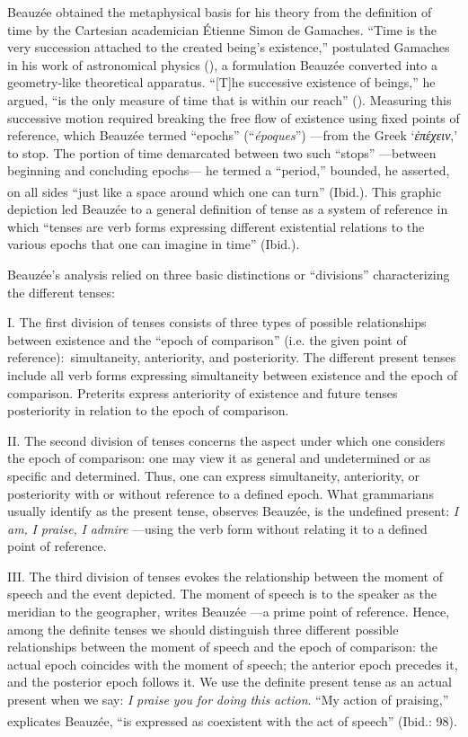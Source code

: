 \documentclass[output=paper]{langsci/langscibook}
\begin{document}
 Beauzée obtained the metaphysical basis for his theory from the definition of time by the Cartesian academician Étienne Simon de Gamaches. “Time is the very succession attached to the created being’s existence,” postulated Gamaches in his work of astronomical physics (\citeyear[28]{gamaches_astronomie_1740}), a formulation Beauzée converted into a geometry\nobreakdash-like theoretical apparatus. “[T]he successive existence of beings,” he argued, “is the only measure of time that is within our reach” (\citealt[96]{beauzee_tems_1765}). Measuring this successive motion required breaking the free flow of existence using fixed points of reference, which Beauzée termed “epochs” (“\textit{époques}”) —from the Greek ‘\textit{ἐπέχειν},’ to stop. The portion of time demarcated between two such “stops” —between beginning and concluding epochs— he termed a “period,” bounded, he asserted, on all sides “just like a space around which one can turn”\textsuperscript{} (Ibid.). This graphic depiction led Beauzée to a general definition of tense as a system of reference in which “tenses are verb forms expressing different existential relations to the various epochs that one can imagine in time” (Ibid.).
 
 Beauzée’s analysis relied on three basic distinctions or “divisions” characterizing the different tenses:
 
 I. The first division of tenses consists of three types of possible relationships between existence and the “epoch of comparison” (i.e. the given point of reference):~simultaneity, anteriority, and posteriority. The different present tenses include all verb forms expressing simultaneity between existence and the epoch of comparison. Preterits express anteriority of existence and future tenses posteriority in relation to the epoch of comparison.
 
 II. The second division of tenses concerns the aspect under which one considers the epoch of comparison: one may view it as general and undetermined or as specific and determined. Thus, one can express simultaneity, anteriority, or posteriority with or without reference to a defined epoch. What grammarians usually identify as the present tense, observes Beauzée, is the undefined present: \textit{I} \textit{am,} \textit{I} \textit{praise,} \textit{I} \textit{admire} —using the verb form without relating it to a defined point of reference.
 
 III. The third division of tenses evokes the relationship between the moment of speech and the event depicted. The moment of speech is to the speaker as the meridian to the geographer, writes Beauzée —a prime point of reference. Hence, among the definite tenses we should distinguish three different possible relationships between the moment of speech and the epoch of comparison: the actual epoch coincides with the moment of speech; the anterior epoch precedes it, and the posterior epoch follows it. We use the definite present tense as an actual present when we say: \textit{I} \textit{praise} \textit{you} \textit{for} \textit{doing} \textit{this} \textit{action}. “My action of praising,” explicates Beauzée, “is expressed as coexistent with the act of speech”\textsuperscript{} (Ibid.: 98).
 
\end{document}
